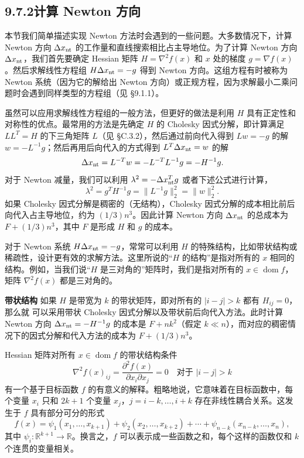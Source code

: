 \documentclass[UTF8,12pt,a4paper,fontset=fandol]{ctexart}
\begin{document}
\subsection*{9.7.2\quad 计算 Newton 方向}

本节我们简单描述实现 Newton 方法时会遇到的一些问题。大多数情况下，计算 Newton 方向 $\Delta x_{\rm nt}$ 的工作量和直线搜索相比占主导地位。为了计算 Newton 方向 $\Delta x_{\rm nt}$，我们首先要确定 Hessian 矩阵 $H=\nabla^2 f(x)$ 和 $x$ 处的梯度 $g=\nabla f(x)$。然后求解线性方程组 $H\Delta x_{\rm nt}=-g$ 得到 Newton 方向。这组方程有时被称为 Newton 系统（因为它的解给出 Newton 方向）或正规方程，因为求解最小二乘问题时会遇到同样类型的方程组（见 \S9.1.1）。

虽然可以应用求解线性方程组的一般方法，但更好的做法是利用 $H$ 具有正定性和对称性的优点。最常用的方法是先确定 $H$ 的 Cholesky 因式分解，即计算满足 $LL^T=H$ 的下三角矩阵 $L$（见 \S C.3.2），然后通过前向代入得到 $Lw=-g$ 的解 $w=-L^{-1}g$；然后再用后向代入的方式得到 $L^T\Delta x_{\rm nt}=w$ 的解
\[
\Delta x_{\rm nt}=L^{-T}w=-L^{-T}L^{-1}g=-H^{-1}g.
\]
对于 Newton 减量，我们可以利用 $\lambda^2=-\Delta x_{\rm nt}^Tg$ 或者下述公式进行计算，
\[
\lambda^2=g^TH^{-1}g=\|L^{-1}g\|_2^2=\|w\|_2^2.
\]
如果 Cholesky 因式分解是稠密的（无结构），Cholesky 因式分解的成本相比前后向代入占主导地位，约为 $(1/3)n^3$。因此计算 Newton 方向 $\Delta x_{\rm nt}$ 的总成本为 $F+(1/3)n^3$，其中 $F$ 是形成 $H$ 和 $g$ 的成本。

对于 Newton 系统 $H\Delta x_{\rm nt}=-g$，常常可以利用 $H$ 的特殊结构，比如带状结构或稀疏性，设计更有效的求解方法。这里所说的“$H$ 的结构”是指对所有的 $x$ 相同的结构。例如，当我们说“$H$ 是三对角的”矩阵时，我们是指对所有的 $x\in\operatorname{dom} f$，矩阵 $\nabla^2 f(x)$ 都是三对角的。

\noindent\textbf{带状结构}\quad
如果 $H$ 是带宽为 $k$ 的带状矩阵，即对所有的 $|i-j|>k$ 都有 $H_{ij}=0$，那么就
可以采用带状 Cholesky 因式分解以及带状前后向代入方法。此时计算 Newton 方向 $\Delta x_{\rm nt}=-H^{-1}g$ 的成本是 $F+nk^2$（假定 $k\ll n$），而对应的稠密情况下的因式分解和代入方法的成本为 $F+(1/3)n^3$。

Hessian 矩阵对所有 $x\in\operatorname{dom} f$ 的带状结构条件
\[
\nabla^2 f(x)_{ij}=\frac{\partial^2 f(x)}{\partial x_i\partial x_j}=0\quad \text{对于 } |i-j|>k
\]
有一个基于目标函数 $f$ 的有意义的解释。粗略地说，它意味着在目标函数中，每个变量 $x_i$ 只和 $2k+1$ 个变量 $x_j$，$j=i-k,\ldots,i+k$ 存在非线性耦合关系。这发生于 $f$ 具有部分可分的形式
\[
f(x)=\psi_1(x_1,\ldots,x_{k+1})+\psi_2(x_2,\ldots,x_{k+2})+\cdots+\psi_{n-k}(x_{n-k},\ldots,x_n),
\]
其中 $\psi_i:\mathbb{R}^{k+1}\to\mathbb{R}$。换言之，$f$ 可以表示成一些函数之和，每个这样的函数仅和 $k$ 个连贯的变量相关。
\end{document}
